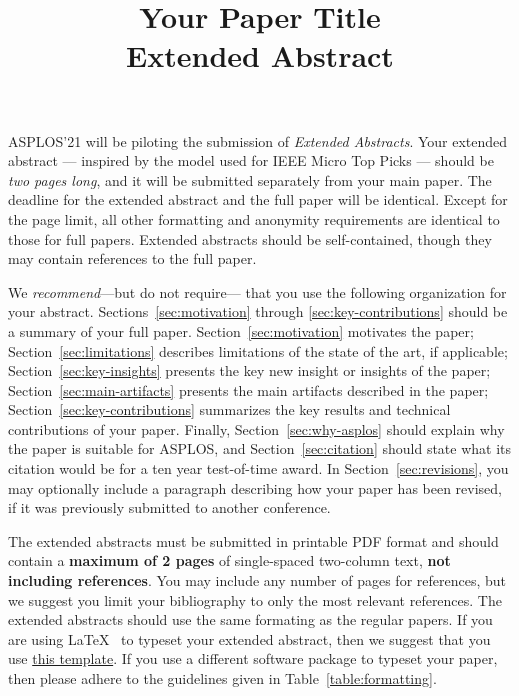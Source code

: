 \documentclass[pageno]{jpaper}
\begin{document}
\title{Your Paper Title \\ \textbf{Extended Abstract}}

\date{}

\maketitle

\thispagestyle{empty}




ASPLOS'21 will be piloting the submission of {\it Extended
Abstracts}. Your extended abstract — inspired by the model used for
IEEE Micro Top
Picks — should be {\it two pages long}, and it will be submitted separately
from your main paper. The deadline for the extended abstract and the
full paper will be identical. Except for the page limit, all other
formatting and anonymity requirements are identical to those for full
papers. Extended abstracts should be self-contained, though they may
contain references to the full paper.

We \emph{recommend}---but do not require--- that you use
the following organization for your abstract. 
Sections~\ref{sec:motivation} through \ref{sec:key-contributions}
should be a summary of your full paper. Section~\ref{sec:motivation}
motivates the paper; Section~\ref{sec:limitations} describes
limitations of the state of the art, if applicable;
Section~\ref{sec:key-insights} presents the key new insight or
insights of the paper; 
Section~\ref{sec:main-artifacts} presents the main artifacts described
in the paper;  Section~\ref{sec:key-contributions} summarizes the key
results and technical contributions of your paper. Finally,
Section~\ref{sec:why-asplos} should explain why the paper is suitable
for ASPLOS, and Section~\ref{sec:citation} should state what its
citation would be for a ten year test-of-time award. In
Section~\ref{sec:revisions}, you may optionally include a paragraph
describing how your paper has been revised, if it was previously
submitted to another conference.

The extended abstracts must be submitted in printable PDF format and should contain a
{\bf maximum of 2 pages} of single-spaced two-column text, {\bf not
  including references}.  You may include any number of pages for
references, but we suggest you limit your bibliography to
only the most relevant references. The extended
abstracts should use the same formating as the regular papers. If you are using
\LaTeX~\cite{lamport94} to typeset your extended abstract, then we suggest that
you use \href{https://asplos-conference.org/wp-content/uploads/2020/06/asplos21-templates.zip}{this template}.
If you use a different
software package to typeset your paper, then please adhere to the
guidelines given in Table~\ref{table:formatting}.
\end{document}
